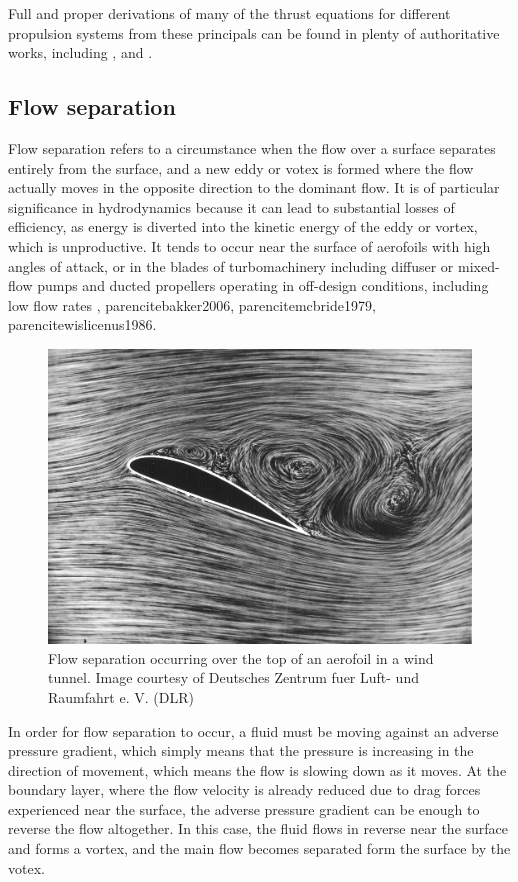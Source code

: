 \documentclass{article}\usepackage[]{graphicx}\usepackage[]{color}
\begin{document}
Full and proper derivations of many of the thrust equations for different propulsion systems from these principals can be found in plenty of authoritative works, including \cite{lewis1988}, \cite{carlton2007} and \cite{mollard2011}.

\subsection{Flow separation}
Flow separation refers to a circumstance when the flow over a surface separates entirely from the surface, and a new eddy or votex is formed where the flow actually moves in the opposite direction to the dominant flow.  It is of particular significance in hydrodynamics because it can lead to substantial losses of efficiency, as energy is diverted into the kinetic energy of the eddy or vortex, which is unproductive. It tends to occur near the surface of aerofoils with high angles of attack, or in the blades of turbomachinery including diffuser or mixed-flow pumps and ducted propellers operating in off-design conditions, including low flow rates \parencite{li2013}, parencite{bakker2006}, parencite{mcbride1979}, parencite{wislicenus1986}.

\begin{figure}
\includegraphics[width=\textwidth]{SeparatedAerofoil.jpg}
\caption{Flow separation occurring over the top of an aerofoil in a wind tunnel. Image courtesy of Deutsches Zentrum fuer Luft- und Raumfahrt e. V. (DLR)}
\label{fig:SeparatedAerofoil.jpg}
\end{figure}

In order for flow separation to occur, a fluid must be moving against an adverse pressure gradient, which simply means that the pressure is increasing in the direction of movement, which means the flow is slowing down as it moves.  At the boundary layer, where the flow velocity is already reduced due to drag forces experienced near the surface, the adverse pressure gradient can be enough to reverse the flow altogether.  In this case, the fluid flows in reverse near the surface and forms a vortex, and the main flow becomes separated form the surface by the votex.
\end{document}
